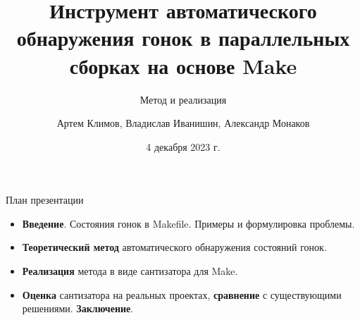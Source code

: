 


    \title{Инструмент автоматического обнаружения гонок в параллельных сборках на основе Make}
    \subtitle{Метод и реализация}
    \date{4 декабря 2023 г.}
    \author{Артем Климов, Владислав Иванишин, Александр Монаков}

    \captionsetup{font=footnotesize,labelformat=empty}


    \begin{frame}[label=current,plain] %
        \titlepage
    \end{frame}

    \begin{frame}[label=current]{План презентации}
        \begin{itemize}
            \setlength\itemsep{1.1em}
            \item \textbf{Введение}. Состояния гонок в Makefile. Примеры и формулировка проблемы.
            \item \textbf{Теоретический метод} автоматического обнаружения состояний гонок.
            \item \textbf{Реализация} метода в виде сантизатора для Make.
            \item \textbf{Оценка} сантизатора на реальных проектах, \textbf{сравнение} с существующими решениями. \textbf{Заключение}.
        \end{itemize}

    \end{frame}

